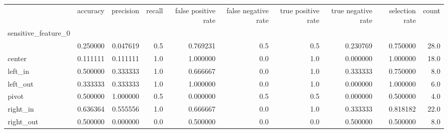 \begin{tabular}{lrrrrrrrrr}
\toprule
{} &  accuracy &  precision &  recall &  false positive rate &  false negative rate &  true positive rate &  true negative rate &  selection rate &  count \\
sensitive\_feature\_0 &           &            &         &                      &                      &                     &                     &                 &        \\
\midrule
                    &  0.250000 &   0.047619 &     0.5 &             0.769231 &                  0.5 &                 0.5 &            0.230769 &        0.750000 &   28.0 \\
center              &  0.111111 &   0.111111 &     1.0 &             1.000000 &                  0.0 &                 1.0 &            0.000000 &        1.000000 &   18.0 \\
left\_in             &  0.500000 &   0.333333 &     1.0 &             0.666667 &                  0.0 &                 1.0 &            0.333333 &        0.750000 &    8.0 \\
left\_out            &  0.333333 &   0.333333 &     1.0 &             1.000000 &                  0.0 &                 1.0 &            0.000000 &        1.000000 &    6.0 \\
pivot               &  0.500000 &   1.000000 &     0.5 &             0.000000 &                  0.5 &                 0.5 &            0.000000 &        0.500000 &    4.0 \\
right\_in            &  0.636364 &   0.555556 &     1.0 &             0.666667 &                  0.0 &                 1.0 &            0.333333 &        0.818182 &   22.0 \\
right\_out           &  0.500000 &   0.000000 &     0.0 &             0.500000 &                  0.0 &                 0.0 &            0.500000 &        0.500000 &    8.0 \\
\bottomrule
\end{tabular}
